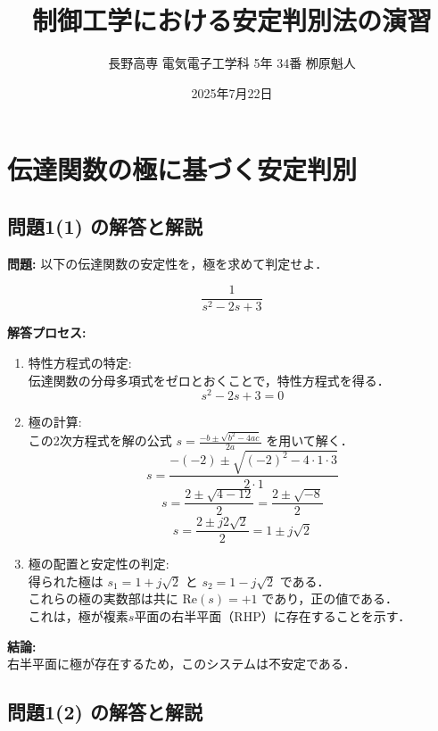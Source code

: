 \documentclass[11pt,a4paper]{ltjsarticle}
\begin{document}
\title{制御工学における安定判別法の演習}
\author{長野高専 電気電子工学科 5年 34番 栁原魁人}
\date{2025年7月22日}
\maketitle
\thispagestyle{fancy}

\section{伝達関数の極に基づく安定判別}

\subsection{問題1(1) の解答と解説}

\textbf{問題:} 以下の伝達関数の安定性を，極を求めて判定せよ．

$$\frac{1}{s^2-2s+3}$$

\textbf{解答プロセス:}

\begin{enumerate}
\item 特性方程式の特定:\\
伝達関数の分母多項式をゼロとおくことで，特性方程式を得る．
$$s^2-2s+3=0$$

\item 極の計算:\\
この2次方程式を解の公式 $s=\frac{-b\pm\sqrt{b^2-4ac}}{2a}$ を用いて解く．
$$s = \frac{-(-2) \pm \sqrt{(-2)^2 - 4 \cdot 1 \cdot 3}}{2 \cdot 1}$$
$$s = \frac{2 \pm \sqrt{4 - 12}}{2} = \frac{2 \pm \sqrt{-8}}{2}$$
$$s = \frac{2 \pm j2\sqrt{2}}{2} = 1 \pm j\sqrt{2}$$

\item 極の配置と安定性の判定:\\
得られた極は $s_1=1+j\sqrt{2}$ と $s_2=1-j\sqrt{2}$ である．\\
これらの極の実数部は共に $\mathrm{Re}(s)=+1$ であり，正の値である．\\
これは，極が複素$s$平面の右半平面（RHP）に存在することを示す．
\end{enumerate}

\textbf{結論:}\\
右半平面に極が存在するため，このシステムは不安定である．

\subsection{問題1(2) の解答と解説}
\end{document}
